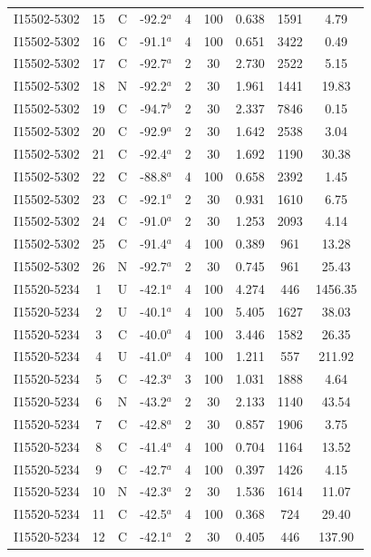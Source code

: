 \begin{table}
\begin{tabular}{ccccccccc}
I15502-5302 & 15 & C & -92.2$^{a}$ & 4 & 100 & 0.638 & 1591 & 4.79 \\
I15502-5302 & 16 & C & -91.1$^{a}$ & 4 & 100 & 0.651 & 3422 & 0.49 \\
I15502-5302 & 17 & C & -92.7$^{a}$ & 2 & 30 & 2.730 & 2522 & 5.15 \\
I15502-5302 & 18 & N & -92.2$^{a}$ & 2 & 30 & 1.961 & 1441 & 19.83 \\
I15502-5302 & 19 & C & -94.7$^{b}$ & 2 & 30 & 2.337 & 7846 & 0.15 \\
I15502-5302 & 20 & C & -92.9$^{a}$ & 2 & 30 & 1.642 & 2538 & 3.04 \\
I15502-5302 & 21 & C & -92.4$^{a}$ & 2 & 30 & 1.692 & 1190 & 30.38 \\
I15502-5302 & 22 & C & -88.8$^{a}$ & 4 & 100 & 0.658 & 2392 & 1.45 \\
I15502-5302 & 23 & C & -92.1$^{a}$ & 2 & 30 & 0.931 & 1610 & 6.75 \\
I15502-5302 & 24 & C & -91.0$^{a}$ & 2 & 30 & 1.253 & 2093 & 4.14 \\
I15502-5302 & 25 & C & -91.4$^{a}$ & 4 & 100 & 0.389 & 961 & 13.28 \\
I15502-5302 & 26 & N & -92.7$^{a}$ & 2 & 30 & 0.745 & 961 & 25.43 \\
I15520-5234 & 1 & U & -42.1$^{a}$ & 4 & 100 & 4.274 & 446 & 1456.35 \\
I15520-5234 & 2 & U & -40.1$^{a}$ & 4 & 100 & 5.405 & 1627 & 38.03 \\
I15520-5234 & 3 & C & -40.0$^{a}$ & 4 & 100 & 3.446 & 1582 & 26.35 \\
I15520-5234 & 4 & U & -41.0$^{a}$ & 4 & 100 & 1.211 & 557 & 211.92 \\
I15520-5234 & 5 & C & -42.3$^{a}$ & 3 & 100 & 1.031 & 1888 & 4.64 \\
I15520-5234 & 6 & N & -43.2$^{a}$ & 2 & 30 & 2.133 & 1140 & 43.54 \\
I15520-5234 & 7 & C & -42.8$^{a}$ & 2 & 30 & 0.857 & 1906 & 3.75 \\
I15520-5234 & 8 & C & -41.4$^{a}$ & 4 & 100 & 0.704 & 1164 & 13.52 \\
I15520-5234 & 9 & C & -42.7$^{a}$ & 4 & 100 & 0.397 & 1426 & 4.15 \\
I15520-5234 & 10 & N & -42.3$^{a}$ & 2 & 30 & 1.536 & 1614 & 11.07 \\
I15520-5234 & 11 & C & -42.5$^{a}$ & 4 & 100 & 0.368 & 724 & 29.40 \\
I15520-5234 & 12 & C & -42.1$^{a}$ & 2 & 30 & 0.405 & 446 & 137.90 \\

\end{tabular}
\end{table}
